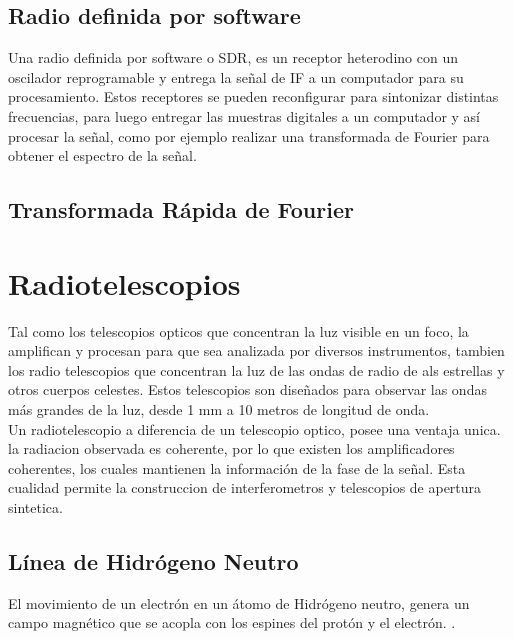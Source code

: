 \subsection{Radio definida por software}

Una radio definida por software o SDR, es un receptor heterodino con un oscilador reprogramable y entrega la señal de IF a un computador para su procesamiento. Estos receptores se pueden reconfigurar para sintonizar distintas frecuencias, para luego entregar las muestras digitales a un computador y así procesar la señal, como por ejemplo realizar una transformada de Fourier para obtener el espectro de la señal.\\

\subsection{Transformada Rápida de Fourier}




\section{Radiotelescopios}

Tal como los telescopios opticos que concentran la luz visible en un foco, la amplifican y procesan para que sea analizada por diversos instrumentos, tambien los radio telescopios que concentran la luz de las ondas de radio de als estrellas y otros cuerpos celestes. Estos telescopios son diseñados para observar las ondas más grandes de la luz, desde 1 mm a 10 metros de longitud de onda. \cite{nraoRadioTelescopes}\\

Un radiotelescopio a diferencia de un telescopio optico, posee una ventaja unica. la radiacion observada es coherente, por lo que existen los amplificadores coherentes, los cuales mantienen la información de la fase de la señal. Esta cualidad permite la construccion de interferometros y telescopios de apertura sintetica\cite{Ransom2016}.\\ 

\subsection{Línea de Hidrógeno Neutro}

El movimiento de un electrón en un átomo de Hidrógeno neutro, genera un campo magnético que se acopla con los espines del protón y el electrón.  \cite{Restrepo2023}.\\

